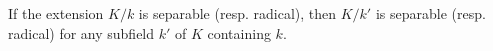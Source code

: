 If the extension $K/k$ is separable (resp. radical), then $K/k'$ is separable (resp. radical) for any subfield $k'$ of $K$ containing $k$.
